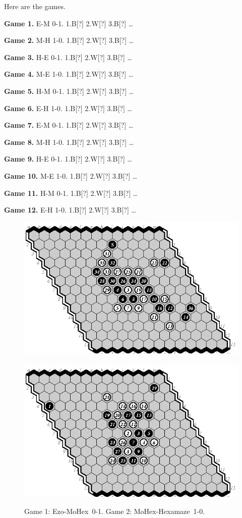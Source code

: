 \documentclass{icga}
\def\Eo{\mbox{\sc Ezo}}
\def\Hz{\mbox{\sc Hexamaze}}
\def\Mx{\mbox{\sc MoHex}}
\begin{document}
Here are the games.

{\bf Game 1.}
{\sc E-M 0-1.}
1.B[?] 2.W[?] 3.B[?] \ldots ~ ~ 

{\bf Game 2.}
{\sc M-H 1-0.}
1.B[?] 2.W[?] 3.B[?] \ldots ~ ~ 

{\bf Game 3.}
{\sc H-E 0-1.}
1.B[?] 2.W[?] 3.B[?] \ldots ~ ~ 

{\bf Game 4.}
{\sc M-E 1-0.}
1.B[?] 2.W[?] 3.B[?] \ldots ~ ~ 

{\bf Game 5.}
{\sc H-M 0-1.}
1.B[?] 2.W[?] 3.B[?] \ldots ~ ~ 

{\bf Game 6.}
{\sc E-H 1-0.}
1.B[?] 2.W[?] 3.B[?] \ldots ~ ~ 

{\bf Game 7.}
{\sc E-M 0-1.}
1.B[?] 2.W[?] 3.B[?] \ldots ~ ~ 

{\bf Game 8.}
{\sc M-H 1-0.}
1.B[?] 2.W[?] 3.B[?] \ldots ~ ~ 

{\bf Game 9.}
{\sc H-E 0-1.}
1.B[?] 2.W[?] 3.B[?] \ldots ~ ~ 

{\bf Game 10.}
{\sc M-E 1-0.}
1.B[?] 2.W[?] 3.B[?] \ldots ~ ~ 

{\bf Game 11.}
{\sc H-M 0-1.}
1.B[?] 2.W[?] 3.B[?] \ldots ~ ~ 

{\bf Game 12.}
{\sc E-H 1-0.}
1.B[?] 2.W[?] 3.B[?] \ldots ~ ~ 

\begin{figure}[hbp]
\includegraphics[scale=1.2]{games/pix/13-01-em-0-1.eps}\hspace*{-1cm}\
\includegraphics[scale=1.2]{games/pix/13-02-mh-1-0.eps}
\caption{Game 1: \Eo-\Mx\ 0-1. Game 2: \Mx-\Hz\ 1-0.}
\end{figure}
\end{document}
